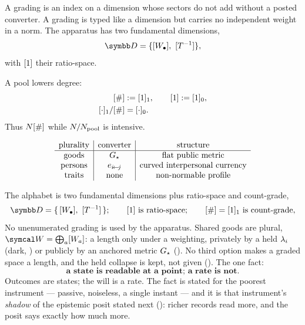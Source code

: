 \documentclass[../main]{subfiles}
\begin{document}
\begin{definition}
  A grading is an index on a dimension whose sectors do not add without a posted converter.
  A grading is typed like a dimension but carries no independent weight in a norm.
  The apparatus has two fundamental dimensions,
  \begin{equation}
    \dimspace = \{\dimwelfare,\ \dimrate\},
    \label{eq:gen:dimspace}
  \end{equation}
  with $[1]$ their ratio-space.
\end{definition}

\begin{definition}
  A pool lowers degree:
  \begin{align}
    [\#] &:= [1]\sb{1}, \qquad [1] := [1]\sb{0},
      \label{eq:gen:extdef}\\
    [\cdot]\sb{1}/[\#] &= [\cdot]\sb{0}.
      \label{eq:gen:pool}
  \end{align}
  Thus $N[\#]$ while $N/N\sb{\mathrm{pool}}$ is intensive.
\end{definition}

\begin{definition}
  \begin{equation}
    \begin{array}{c|c|c}
      \text{plurality} & \text{converter} & \text{structure} \\
      \hline
      \text{goods} & G\sb{\star} & \text{flat public metric} \\
      \text{persons} & e\sb{ \ensuremath{i\!\leftarrow\!j} } & \text{curved interpersonal currency} \\
      \text{traits} & \text{none} & \text{non-normable profile}
    \end{array}
    \label{eq:gen:trich}
  \end{equation}
\end{definition}

The alphabet is two fundamental dimensions plus ratio-space and count-grade,
\begin{equation}
  \dimspace=\{\,\dimwelfare,\ \dimrate\,\};\qquad
  \dimratio\text{ is ratio-space};\qquad
  \dimcount=\countgrade\text{ is count-grade},
  \label{gen:alph}
\end{equation}
No unenumerated grading is used by the apparatus. Shared goods are plural,
$\outcomespace=\bigoplus_a\dimgood{a}$: a length only under a weighting, privately by a
held $\lambda\sb{i}$ (dark, ) or publicly by an anchored metric
$G\sb{\star}$ (). No third option makes a graded space a length, and the held
collapse is kept, not given (). The one fact:
\begin{equation}
  \boxed{\textbf{a state is readable at a point; a rate is not.}}
  \label{eq:gen:fact}
\end{equation}
Outcomes are states; the will is a rate. The fact is stated for the poorest instrument
--- passive, noiseless, a single instant --- and it is that instrument's \emph{shadow}
of the epistemic posit stated next (): richer records read more, and
the posit says exactly how much more.
\end{document}
